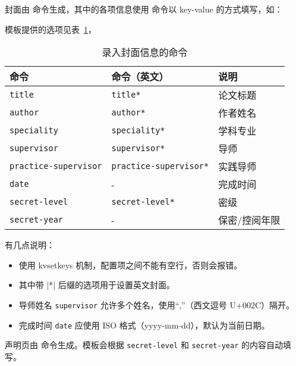 \documentclass[a4paper]{ltxdoc}
\DeclareRobustCommand\pkg{\textsf}
\DeclareRobustCommand\opt{\texttt}
\begin{document}
\DescribeMacro{\maketitle}
封面由  命令生成，其中的各项信息使用  命令以
key-value 的方式填写，如：
\begin{latex}
\end{latex}
模板提供的选项见表~\ref{tab:covercmds}，
\begin{table}[htb]
  \centering\small
  \caption{录入封面信息的命令}
  \label{tab:covercmds}
  \begin{tabular}{lll}
    \toprule
    命令               & 命令（英文）        & 说明          \\
    \midrule
    \opt{title}        & \opt{title*}        & 论文标题      \\
    \opt{author}       & \opt{author*}       & 作者姓名      \\
    \opt{speciality}   & \opt{speciality*}   & 学科专业      \\
    \opt{supervisor}   & \opt{supervisor*}   & 导师      \\
    \opt{practice-supervisor} & \opt{practice-supervisor*} & 实践导师 \\
    \opt{date}         & -                   & 完成时间      \\
    \opt{secret-level} & \opt{secret-level*} & 密级          \\
    \opt{secret-year}  & -                   & 保密/控阅年限 \\
    \bottomrule
  \end{tabular}
\end{table}

有几点说明：
\begin{itemize}
  \item {} 使用 \pkg{kvsetkeys} 机制，配置项之间不能有空行，否则会报错。
  \item 其中带 |*| 后缀的选项用于设置英文封面。
  \item 导师姓名 \opt{supervisor} 允许多个姓名，使用“,”（西文逗号 U+002C）隔开。
  \item 完成时间 \opt{date} 应使用 ISO 格式（yyyy-mm-dd），默认为当前日期。
\end{itemize}

\DescribeMacro{\copyrightpage}
声明页由  命令生成。模板会根据 \opt{secret-level} 和
\opt{secret-year} 的内容自动填写。
\end{document}
